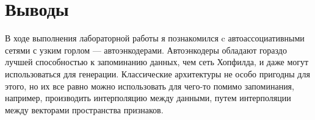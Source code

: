 \section{Выводы}
В ходе выполнения лабораторной работы я познакомился c автоассоциативными сетями с узким горлом --- автоэнкодерами. Автоэнкодеры обладают гораздо лучшей способностью к запоминанию данных, чем сеть Хопфилда, и даже могут использоваться для генерации. Классические архитектуры не особо пригодны для этого, но их все равно можно использовать для чего-то помимо запоминания, например, производить интерполяцию между данными, путем интерполяции между векторами пространства признаков.
\pagebreak
